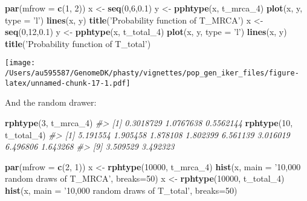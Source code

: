 \documentclass[]{article}
\newenvironment{Shaded}{\begin{snugshade}}{\end{snugshade}}
\newcommand{\CommentTok}[1]{\textcolor[rgb]{0.56,0.35,0.01}{\textit{#1}}}
\newcommand{\DataTypeTok}[1]{\textcolor[rgb]{0.13,0.29,0.53}{#1}}
\newcommand{\DecValTok}[1]{\textcolor[rgb]{0.00,0.00,0.81}{#1}}
\newcommand{\FloatTok}[1]{\textcolor[rgb]{0.00,0.00,0.81}{#1}}
\newcommand{\KeywordTok}[1]{\textcolor[rgb]{0.13,0.29,0.53}{\textbf{#1}}}
\newcommand{\NormalTok}[1]{#1}
\newcommand{\StringTok}[1]{\textcolor[rgb]{0.31,0.60,0.02}{#1}}
\begin{document}
\begin{Shaded}
\begin{Highlighting}[]
\KeywordTok{par}\NormalTok{(}\DataTypeTok{mfrow =} \KeywordTok{c}\NormalTok{(}\DecValTok{1}\NormalTok{, }\DecValTok{2}\NormalTok{))}
\NormalTok{x <-}\StringTok{ }\KeywordTok{seq}\NormalTok{(}\DecValTok{0}\NormalTok{,}\DecValTok{6}\NormalTok{,}\FloatTok{0.1}\NormalTok{)}
\NormalTok{y <-}\StringTok{ }\KeywordTok{pphtype}\NormalTok{(x, t_mrca_}\DecValTok{4}\NormalTok{)}
\KeywordTok{plot}\NormalTok{(x, y, }\DataTypeTok{type =} \StringTok{'l'}\NormalTok{)}
\KeywordTok{lines}\NormalTok{(x, y)}
\KeywordTok{title}\NormalTok{(}\StringTok{'Probability function of T_MRCA'}\NormalTok{)}
\NormalTok{x <-}\StringTok{ }\KeywordTok{seq}\NormalTok{(}\DecValTok{0}\NormalTok{,}\DecValTok{12}\NormalTok{,}\FloatTok{0.1}\NormalTok{)}
\NormalTok{y <-}\StringTok{ }\KeywordTok{pphtype}\NormalTok{(x, t_total_}\DecValTok{4}\NormalTok{)}
\KeywordTok{plot}\NormalTok{(x, y, }\DataTypeTok{type =} \StringTok{'l'}\NormalTok{)}
\KeywordTok{lines}\NormalTok{(x, y)}
\KeywordTok{title}\NormalTok{(}\StringTok{'Probability function of T_total'}\NormalTok{)}
\end{Highlighting}
\end{Shaded}

\texttt{[image: /Users/au595587/GenomeDK/phasty/vignettes/pop\_gen\_iker\_files/figure-latex/unnamed-chunk-17-1.pdf]}

And the random drawer:

\begin{Shaded}
\begin{Highlighting}[]
\KeywordTok{rphtype}\NormalTok{(}\DecValTok{3}\NormalTok{, t_mrca_}\DecValTok{4}\NormalTok{)}
\CommentTok{#> [1] 0.3018729 1.0767638 0.5562144}
\KeywordTok{rphtype}\NormalTok{(}\DecValTok{10}\NormalTok{, t_total_}\DecValTok{4}\NormalTok{)}
\CommentTok{#>  [1] 5.191554 1.905458 1.878108 1.802399 6.561139 3.016019 6.496806 1.643268}
\CommentTok{#>  [9] 3.509529 3.492323}
\end{Highlighting}
\end{Shaded}

\begin{Shaded}
\begin{Highlighting}[]
\KeywordTok{par}\NormalTok{(}\DataTypeTok{mfrow =} \KeywordTok{c}\NormalTok{(}\DecValTok{2}\NormalTok{, }\DecValTok{1}\NormalTok{))}
\NormalTok{x <-}\StringTok{ }\KeywordTok{rphtype}\NormalTok{(}\DecValTok{10000}\NormalTok{, t_mrca_}\DecValTok{4}\NormalTok{)}
\KeywordTok{hist}\NormalTok{(x, }\DataTypeTok{main =} \StringTok{'10,000 random draws of T_MRCA'}\NormalTok{, }\DataTypeTok{breaks=}\DecValTok{50}\NormalTok{)}
\NormalTok{x <-}\StringTok{ }\KeywordTok{rphtype}\NormalTok{(}\DecValTok{10000}\NormalTok{, t_total_}\DecValTok{4}\NormalTok{)}
\KeywordTok{hist}\NormalTok{(x, }\DataTypeTok{main =} \StringTok{'10,000 random draws of T_total'}\NormalTok{, }\DataTypeTok{breaks=}\DecValTok{50}\NormalTok{)}
\end{Highlighting}
\end{Shaded}
\end{document}

